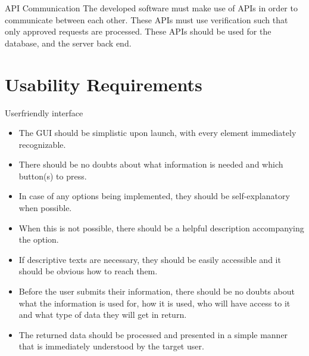 \begin{requirement}{\ac{API} Communication}
The developed software must make use of \ac{API}s in order to communicate between
each other. These \ac{API}s must use verification such that only approved
requests are processed. These \ac{API}s should be used for the database, and the server back
end.
\end{requirement}






\section{Usability Requirements}
\begin{requirement}{Userfriendly interface} 
\begin{itemize}
  \item The \ac{GUI} should be simplistic upon launch, with every element
  immediately recognizable.
  \item There should be no doubts about what information is needed and which button(s) to press.
  \item In case of any options being implemented, they should be self-explanatory when possible.
  \item When this is not possible, there should be a helpful description
  accompanying the option.
  \item If descriptive texts are necessary, they should be easily accessible and
  it should be obvious how to reach them.
  \item Before the user submits their information, there should be no doubts
  about what the information is used for, how it is used, who will have access to it and what type of data they will get in return.
  \item The returned data should be processed and presented in a simple manner that is immediately understood by the
        target user.
\end{itemize}
\end{requirement}